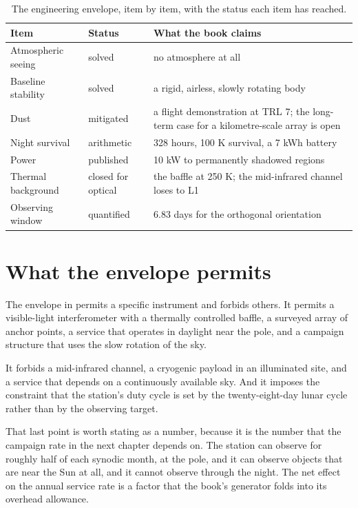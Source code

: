 \begin{table}[!htbp]
\centering
\small
\caption{The engineering envelope, item by item, with the status each item
has reached.}
\label{tab:envelope}
\begin{tabularx}{\textwidth}{@{}P{1.37in}P{1.19in}Y@{}}
\toprule
{}
\textbf{Item} & \textbf{Status} & \textbf{What the book claims} \\
\midrule
Atmospheric seeing & solved & no atmosphere at all \\
Baseline stability & solved & a rigid, airless, slowly rotating body \\
Dust & mitigated & a flight demonstration at TRL 7; the long-term case for
a kilometre-scale array is open \\
Night survival & arithmetic & 328 hours, 100 K survival, a 7 kWh battery \\
Power & published & 10 kW to permanently shadowed regions \\
Thermal background & closed for optical & the baffle at 250 K; the
mid-infrared channel loses to L1 \\
Observing window & quantified & 6.83 days for the orthogonal orientation \\
\bottomrule
\end{tabularx}
\end{table}

\section{What the envelope permits}

The envelope in  permits a specific instrument and
forbids others. It permits a visible-light interferometer with a thermally
controlled baffle, a surveyed array of anchor points, a service that operates
in daylight near the pole, and a campaign structure that uses the slow
rotation of the sky.

It forbids a mid-infrared channel, a cryogenic payload in an illuminated
site, and a service that depends on a continuously available sky. And it
imposes the constraint that the station's duty cycle is set by the
twenty-eight-day lunar cycle rather than by the observing target.

That last point is worth stating as a number, because it is the number that
the campaign rate in the next chapter depends on. The station can observe
for roughly half of each synodic month, at the pole, and it can observe
objects that are near the Sun at all, and it cannot observe through the
night. The net effect on the annual service rate is a factor that the
book's generator folds into its overhead allowance.

